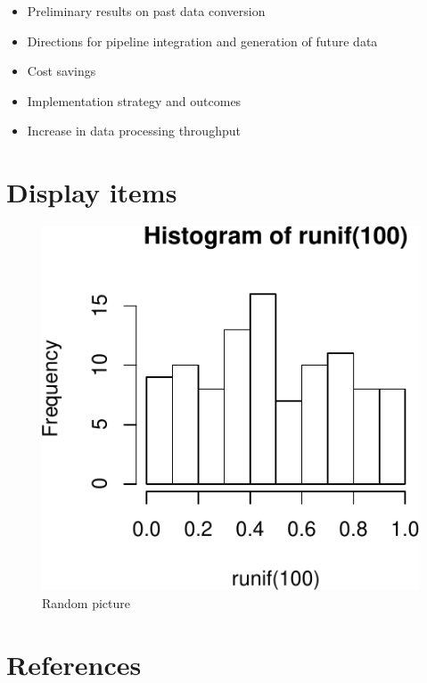 \documentclass[]{article}
\providecommand{\tightlist}{%
  \setlength{\itemsep}{0pt}\setlength{\parskip}{0pt}}
\begin{document}
\begin{itemize}
\tightlist
\item
  Preliminary results on past data conversion
\item
  Directions for pipeline integration and generation of future data
\item
  Cost savings
\item
  Implementation strategy and outcomes
\item
  Increase in data processing throughput
\end{itemize}

\hypertarget{display-items}{%
\section{Display items}\label{display-items}}

\begin{figure}
\centering
\includegraphics{main_files/figure-latex/random-1.pdf}
\caption{\label{pic1}Random picture}
\end{figure}

\hypertarget{references}{%
\section{References}\label{references}}
\end{document}
